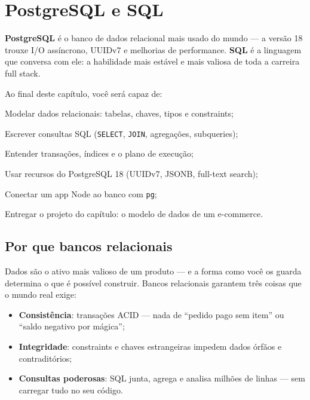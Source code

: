 \chapter{PostgreSQL e SQL}
\label{cap:postgresql}

\begin{caixaconceito}
\textbf{PostgreSQL} é o banco de dados relacional mais usado do mundo
\cite{so2025} — a versão 18 \cite{pg18,pg-docs} trouxe I/O assíncrono,
UUIDv7 e melhorias de performance. \textbf{SQL} é a linguagem que conversa com
ele: a habilidade mais estável e mais valiosa de toda a carreira full stack.
\end{caixaconceito}

Ao final deste capítulo, você será capaz de:
\begin{objetivos}
  \item Modelar dados relacionais: tabelas, chaves, tipos e constraints;
  \item Escrever consultas SQL (\texttt{SELECT}, \texttt{JOIN}, agregações, subqueries);
  \item Entender transações, índices e o plano de execução;
  \item Usar recursos do PostgreSQL 18 (UUIDv7, JSONB, full-text search);
  \item Conectar um app Node ao banco com \texttt{pg};
  \item Entregar o projeto do capítulo: o modelo de dados de um e-commerce.
\end{objetivos}

\section{Por que bancos relacionais}

Dados são o ativo mais valioso de um produto — e a forma como você os guarda
determina o que é possível construir. Bancos relacionais garantem três coisas
que o mundo real exige:

\begin{itemize}[leftmargin=*, itemsep=0.4em]
  \item \textbf{Consistência}: transações ACID — nada de ``pedido pago sem
  item'' ou ``saldo negativo por mágica'';
  \item \textbf{Integridade}: constraints e chaves estrangeiras impedem dados
  órfãos e contraditórios;
  \item \textbf{Consultas poderosas}: SQL junta, agrega e analisa milhões de
  linhas — sem carregar tudo no seu código.
\end{itemize}

